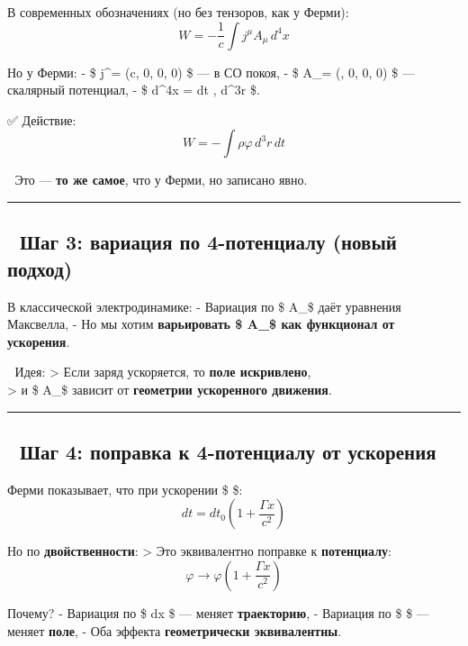\documentclass[11pt]{article}
\begin{document}
В современных обозначениях (но без тензоров, как у Ферми): \[
W = -\frac{1}{c} \int j^\mu A_\mu \, d^4x
\]

Но у Ферми: - \$ j\^{}\mu = (\rho c, 0, 0, 0) \$ --- в СО покоя, - \$
A\_\mu = (\varphi, 0, 0, 0) \$ --- скалярный потенциал, - \$ d\^{}4x =
dt , d\^{}3r \$.

✅ Действие: \[
W = -\int \rho \varphi \, d^3r \, dt
\]

📌 Это --- \textbf{то же самое}, что у Ферми, но записано явно.

\begin{center}\rule{0.5\linewidth}{\linethickness}\end{center}

\subsection{🔹 Шаг 3: вариация по 4-потенциалу (новый
подход)}\label{ux448ux430ux433-3-ux432ux430ux440ux438ux430ux446ux438ux44f-ux43fux43e-4-ux43fux43eux442ux435ux43dux446ux438ux430ux43bux443-ux43dux43eux432ux44bux439-ux43fux43eux434ux445ux43eux434}

В классической электродинамике: - Вариация по \$ A\_\mu \$ даёт
уравнения Максвелла, - Но мы хотим \textbf{варьировать \$ A\_\mu \$ как
функционал от ускорения}.

📌 Идея: \textgreater{} Если заряд ускоряется, то \textbf{поле
искривлено},\\
\textgreater{} и \$ A\_\mu \$ зависит от \textbf{геометрии ускоренного
движения}.

\begin{center}\rule{0.5\linewidth}{\linethickness}\end{center}

\subsection{🔹 Шаг 4: поправка к 4-потенциалу от
ускорения}\label{ux448ux430ux433-4-ux43fux43eux43fux440ux430ux432ux43aux430-ux43a-4-ux43fux43eux442ux435ux43dux446ux438ux430ux43bux443-ux43eux442-ux443ux441ux43aux43eux440ux435ux43dux438ux44f}

Ферми показывает, что при ускорении \$ \Gamma \$: \[
dt = dt_0 \left( 1 + \frac{\Gamma x}{c^2} \right)
\]

Но по \textbf{двойственности}: \textgreater{} Это эквивалентно поправке
к \textbf{потенциалу}: \[
\varphi \to \varphi \left( 1 + \frac{\Gamma x}{c^2} \right)
\]

Почему? - Вариация по \$ dx \$ --- меняет \textbf{траекторию}, -
Вариация по \$ \varphi \$ --- меняет \textbf{поле}, - Оба эффекта
\textbf{геометрически эквивалентны}.
\end{document}

